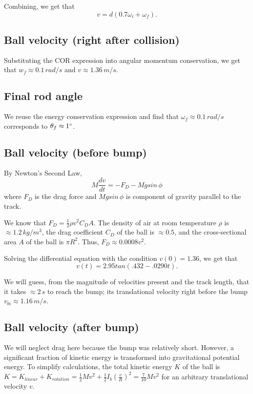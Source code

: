 \documentclass[12pt]{article} %
\begin{document}
Combining, we get that $$v = d(0.7\omega_i + \omega_f).$$

\subsection{Ball velocity (right after collision)}

Substituting the COR expression into angular momentum conservation, we get that $w_f \approx 0.1\,rad/s$ and $v \approx 1.36\,m/s$.

\subsection{Final rod angle}

We reuse the energy conservation expression and find that $\omega_f \approx 0.1\,rad/s$ corresponds to $\theta_f \approx 1\degree$.

\subsection{Ball velocity (before bump)}

By Newton's Second Law,
$$M \frac{dv}{dt} = -F_D - Mgsin\,\phi$$
where $F_D$ is the drag force and $Mgsin\,\phi$ is component of gravity parallel to the track.

We know that $F_D = \frac{1}{2}\rho v^2 C_D A$. The density of air at room temperature $\rho$ is $\approx 1.2\,kg/m^3$, the drag coefficient $C_D$ of the ball is $\approx 0.5$, and the cross-sectional area $A$ of the ball is $\pi R^2$.
Thus, $F_D \approx 0.0008v^2$.

Solving the differential equation with the condition $v(0) = 1.36$, we get that $$v(t) = 2.95tan(.432 - .0290t).$$

We will guess, from the magnitude of velocities present and the track length, that it takes $\approx 2\,s$ to reach the bump; its translational velocity right before the bump $v_{bi} \approx 1.16\,m/s$.

\subsection{Ball velocity (after bump)}

We will neglect drag here because the bump was relatively short.
However, a significant fraction of kinetic energy is transformed into gravitational potential energy.
To simplify calculations, the total kinetic energy $K$ of the ball is $K = K_{linear} + K_{rotation} = \frac{1}{2}Mv^2 + \frac{1}{2}I_b(\frac{v}{R})^2 = \frac{7}{10}Mv^2$ for an arbitrary translational velocity $v$.
\end{document}
